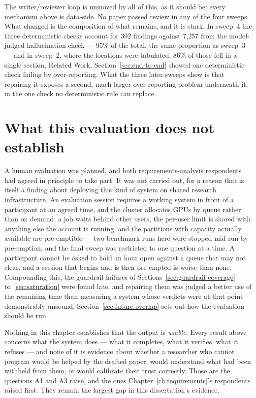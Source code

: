 The writer/reviewer loop is unmoved by all of this, as it should be: every mechanism
above is data-side. No paper passed review in any of the four sweeps. What changed
is the composition of what remains, and it is stark. In sweep~4 the three
deterministic checks account for 392 findings against 7{,}257 from the model-judged
hallucination check --- 95\% of the total, the same proportion as sweep~3 --- and in
sweep~2, where the locations were tabulated, 86\% of those fell in a single section,
Related Work. Section~\ref{sec:end-to-end} showed one deterministic check failing by
over-reporting. What the three later sweeps show is that repairing it exposes a
second, much larger over-reporting problem underneath it, in the one check no
deterministic rule can replace.

\section{What this evaluation does not establish}
\label{sec:limitations}

A human evaluation was planned, and both requirements-analysis respondents had
agreed in principle to take part. It was not carried out, for a reason that is
itself a finding about deploying this kind of system on shared research
infrastructure. An evaluation session requires a working system in front of a
participant at an agreed time, and the cluster allocates GPUs by queue rather
than on demand: a job waits behind other users, the per-user limit is shared with
anything else the account is running, and the partitions with capacity actually
available are pre-emptible --- two benchmark runs here were stopped mid-run by
pre-emption, and the final sweep was restricted to one question at a time. A
participant cannot be asked to hold an hour open against a queue that may not
clear, and a session that begins and is then pre-empted is worse than none.
Compounding this, the guardrail failures of
Sections~\ref{sec:guardrail-coverage} to~\ref{sec:saturation} were found late, and
repairing them was judged a better use of the remaining time than measuring a
system whose verdicts were at that point demonstrably unsound.
Section~\ref{sec:future-overlap} sets out how the evaluation should be run.

Nothing in this chapter establishes that the output is \emph{usable}. Every result
above concerns what the system does --- what it completes, what it verifies, what
it refuses --- and none of it is evidence about whether a researcher who cannot
program would be helped by the drafted paper, would understand what had been
withheld from them, or would calibrate their trust correctly. Those are the
questions A1 and A3 raise, and the ones
Chapter~\ref{ch:requirements}'s respondents raised first. They remain the largest
gap in this dissertation's evidence.

